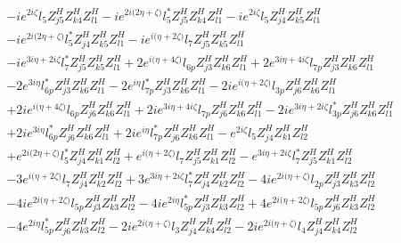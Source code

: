 \begin{align}
 &-i e^{2 i \zeta } l_5 Z_{{j 5}}^{H} Z_{{k 4}}^{H} Z_{{l 1}}^{H} -i e^{2 i \Big(2 \eta +\zeta \Big)} l_5^* Z_{{j 5}}^{H} Z_{{k 4}}^{H} Z_{{l 1}}^{H} -i e^{2 i \zeta } l_5 Z_{{j 4}}^{H} Z_{{k 5}}^{H} Z_{{l 1}}^{H} \nonumber \\ 
 &-i e^{2 i \Big(2 \eta +\zeta \Big)} l_5^* Z_{{j 4}}^{H} Z_{{k 5}}^{H} Z_{{l 1}}^{H} -i e^{i \Big(\eta +2 \zeta \Big)} l_7 Z_{{j 5}}^{H} Z_{{k 5}}^{H} Z_{{l 1}}^{H} \nonumber \\ 
 &-i e^{3 i \eta +2 i \zeta } l_7^* Z_{{j 5}}^{H} Z_{{k 5}}^{H} Z_{{l 1}}^{H} +2 e^{i \Big(\eta +4 \zeta \Big)} l_{6p} Z_{{j 3}}^{H} Z_{{k 6}}^{H} Z_{{l 1}}^{H} +2 e^{3 i \eta +4 i \zeta } l_{7p} Z_{{j 3}}^{H} Z_{{k 6}}^{H} Z_{{l 1}}^{H} \nonumber \\ 
 &-2 e^{3 i \eta } l_{6p}^* Z_{{j 3}}^{H} Z_{{k 6}}^{H} Z_{{l 1}}^{H} -2 e^{i \eta } l_{7p}^* Z_{{j 3}}^{H} Z_{{k 6}}^{H} Z_{{l 1}}^{H} -2 i e^{i \Big(\eta +2 \zeta \Big)} l_{3p} Z_{{j 6}}^{H} Z_{{k 6}}^{H} Z_{{l 1}}^{H} \nonumber \\ 
 &+2 i e^{i \Big(\eta +4 \zeta \Big)} l_{6p} Z_{{j 6}}^{H} Z_{{k 6}}^{H} Z_{{l 1}}^{H} +2 i e^{3 i \eta +4 i \zeta } l_{7p} Z_{{j 6}}^{H} Z_{{k 6}}^{H} Z_{{l 1}}^{H} -2 i e^{3 i \eta +2 i \zeta } l_{3p}^* Z_{{j 6}}^{H} Z_{{k 6}}^{H} Z_{{l 1}}^{H} \nonumber \\ 
 &+2 i e^{3 i \eta } l_{6p}^* Z_{{j 6}}^{H} Z_{{k 6}}^{H} Z_{{l 1}}^{H} +2 i e^{i \eta } l_{7p}^* Z_{{j 6}}^{H} Z_{{k 6}}^{H} Z_{{l 1}}^{H} - e^{2 i \zeta } l_5 Z_{{j 4}}^{H} Z_{{k 1}}^{H} Z_{{l 2}}^{H} \nonumber \\ 
 &+e^{2 i \Big(2 \eta +\zeta \Big)} l_5^* Z_{{j 4}}^{H} Z_{{k 1}}^{H} Z_{{l 2}}^{H} +e^{i \Big(\eta +2 \zeta \Big)} l_7 Z_{{j 5}}^{H} Z_{{k 1}}^{H} Z_{{l 2}}^{H} - e^{3 i \eta +2 i \zeta } l_7^* Z_{{j 5}}^{H} Z_{{k 1}}^{H} Z_{{l 2}}^{H} \nonumber \\ 
 &-3 e^{i \Big(\eta +2 \zeta \Big)} l_7 Z_{{j 4}}^{H} Z_{{k 2}}^{H} Z_{{l 2}}^{H} +3 e^{3 i \eta +2 i \zeta } l_7^* Z_{{j 4}}^{H} Z_{{k 2}}^{H} Z_{{l 2}}^{H} -4 i e^{2 i \Big(\eta +\zeta \Big)} l_{2p} Z_{{j 3}}^{H} Z_{{k 3}}^{H} Z_{{l 2}}^{H} \nonumber \\ 
 &-4 i e^{2 i \Big(\eta +2 \zeta \Big)} l_{5p} Z_{{j 3}}^{H} Z_{{k 3}}^{H} Z_{{l 2}}^{H} -4 i e^{2 i \eta } l_{5p}^* Z_{{j 3}}^{H} Z_{{k 3}}^{H} Z_{{l 2}}^{H} +4 e^{2 i \Big(\eta +2 \zeta \Big)} l_{5p} Z_{{j 6}}^{H} Z_{{k 3}}^{H} Z_{{l 2}}^{H} \nonumber \\ 
 &-4 e^{2 i \eta } l_{5p}^* Z_{{j 6}}^{H} Z_{{k 3}}^{H} Z_{{l 2}}^{H} -2 i e^{2 i \Big(\eta +\zeta \Big)} l_3 Z_{{j 4}}^{H} Z_{{k 4}}^{H} Z_{{l 2}}^{H} -2 i e^{2 i \Big(\eta +\zeta \Big)} l_4 Z_{{j 4}}^{H} Z_{{k 4}}^{H} Z_{{l 2}}^{H} \nonumber \\ 

\end{align}
